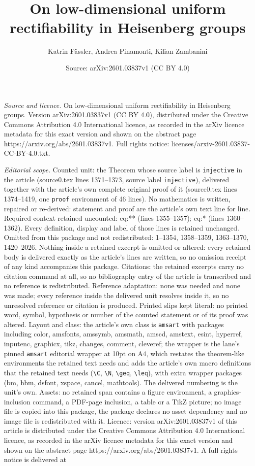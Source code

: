 \documentclass[10pt,a4paper]{amsart}
\title[On low-dimensional uniform rectifiability in Heisenberg grou]{On low-dimensional uniform rectifiability in Heisenberg groups}
\author{Katrin F\"assler, Andrea Pinamonti, Kilian Zambanini}
\date{Source: arXiv:2601.03837v1 (CC BY 4.0)}
\begin{document}
\maketitle

\noindent\emph{Source and licence.} On low-dimensional uniform rectifiability in Heisenberg groups. Version arXiv:2601.03837v1 (CC BY 4.0), distributed under the Creative Commons Attribution 4.0 International licence, as recorded in the arXiv licence metadata for this exact version and shown on the abstract page https://arxiv.org/abs/2601.03837v1. Full rights notice: licenses/arxiv-2601.03837-CC-BY-4.0.txt.\par\smallskip

\noindent\textit{Editorial scope.} Counted unit: the Theorem whose source label is \texttt{injective} in the article (source0.tex lines 1371--1373, source label \texttt{injective}), delivered together with the article's own complete original proof of it (source0.tex lines 1374--1419, one \texttt{proof} environment of 46 lines). No mathematics is written, repaired or re-derived: statement and proof are the article's own text line for line. Required context retained uncounted: eq:** (lines 1355--1357); eq:* (lines 1360--1362). Every definition, display and label of those lines is retained unchanged. Omitted from this package and not redistributed: 1--1354, 1358--1359, 1363--1370, 1420--2026. Nothing inside a retained excerpt is omitted or altered: every retained body is delivered exactly as the article's lines are written, so no omission receipt of any kind accompanies this package. Citations: the retained excerpts carry no citation command at all, so no bibliography entry of the article is transcribed and no reference is redistributed. Reference adaptation: none was needed and none was made; every reference inside the delivered unit resolves inside it, so no unresolved reference or citation is produced. Printed slips kept literal: no printed word, symbol, hypothesis or number of the counted statement or of its proof was altered. Layout and class: the article's own class is \texttt{amsart} with packages including color, amsfonts, amssymb, amsmath, amscd, amstext, esint, hyperref, inputenc, graphicx, tikz, changes, comment, cleveref; the wrapper is the lane's pinned \texttt{amsart} editorial wrapper at 10pt on A4, which restates the theorem-like environments the retained text needs and adds the article's own macro definitions that the retained text needs (\texttt{\textbackslash C}, \texttt{\textbackslash N}, \texttt{\textbackslash geq}, \texttt{\textbackslash leq}), with extra wrapper packages (bm, bbm, dsfont, xspace, cancel, mathtools). The delivered numbering is the unit's own. Assets: no retained span contains a figure environment, a graphics-inclusion command, a PDF-page inclusion, a table or a TikZ picture; no image file is copied into this package, the package declares no asset dependency and no image file is redistributed with it. Licence: version arXiv:2601.03837v1 of this article is distributed under the Creative Commons Attribution 4.0 International licence, as recorded in the arXiv licence metadata for this exact version and shown on the abstract page https://arxiv.org/abs/2601.03837v1. A full rights notice is delivered at 
\end{document}
